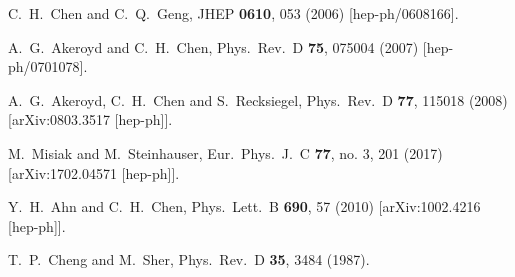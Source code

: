 \documentclass[prd,preprint,superscriptaddress,amsmath,amssymb]{revtex4}
\begin{document}
\begin{thebibliography}{100}
  C.~H.~Chen and C.~Q.~Geng,
  JHEP {\bf 0610}, 053 (2006)
  [hep-ph/0608166].

  A.~G.~Akeroyd and C.~H.~Chen,
  Phys.\ Rev.\ D {\bf 75}, 075004 (2007)
  [hep-ph/0701078].
  
  A.~G.~Akeroyd, C.~H.~Chen and S.~Recksiegel,
  Phys.\ Rev.\ D {\bf 77}, 115018 (2008)
  [arXiv:0803.3517 [hep-ph]].

  
  
  M.~Misiak and M.~Steinhauser,
  Eur.\ Phys.\ J.\ C {\bf 77}, no. 3, 201 (2017)
  [arXiv:1702.04571 [hep-ph]].
 
  
   
  Y.~H.~Ahn and C.~H.~Chen,
  Phys.\ Lett.\ B {\bf 690}, 57 (2010)
  [arXiv:1002.4216 [hep-ph]].


  T.~P.~Cheng and M.~Sher,
  Phys.\ Rev.\ D {\bf 35}, 3484 (1987).


\end{thebibliography}
\end{document}
